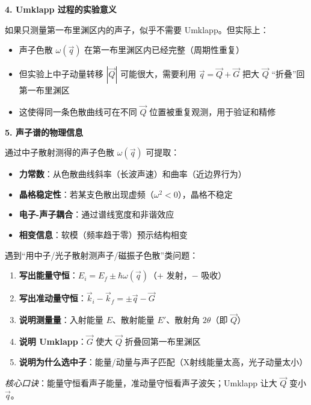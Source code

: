 \begin{insightbox}[实验方法与深层理解]
\textbf{4. Umklapp 过程的实验意义}

如果只测量第一布里渊区内的声子，似乎不需要 Umklapp。但实际上：
\begin{itemize}
    \item 声子色散 $\omega(\vec q)$ 在第一布里渊区内已经完整（周期性重复）
    \item 但实验上中子动量转移 $|\vec Q|$ 可能很大，需要利用 $\vec q=\vec Q+\vec G$ 把大 $\vec Q$ ``折叠''回第一布里渊区
    \item 这使得同一条色散曲线可在不同 $\vec Q$ 位置被重复观测，用于验证和精修
\end{itemize}

\textbf{5. 声子谱的物理信息}

通过中子散射测得的声子色散 $\omega(\vec q)$ 可提取：
\begin{itemize}
    \item \textbf{力常数}：从色散曲线斜率（长波声速）和曲率（近边界行为）
    \item \textbf{晶格稳定性}：若某支色散出现虚频（$\omega^2<0$），晶格不稳定
    \item \textbf{电子-声子耦合}：通过谱线宽度和非谐效应
    \item \textbf{相变信息}：软模（频率趋于零）预示结构相变
\end{itemize}
\end{insightbox}

\begin{thinkbox}
遇到``用中子/光子散射测声子/磁振子色散''类问题：
\begin{enumerate}
    \item \textbf{写出能量守恒}：$E_i = E_f \pm \hbar\omega(\vec q)$（$+$ 发射，$-$ 吸收）
    \item \textbf{写出准动量守恒}：$\vec k_i - \vec k_f = \pm\vec q - \vec G$
    \item \textbf{说明测量量}：入射能量 $E$、散射能量 $E'$、散射角 $2\theta$（即 $\vec Q$）
    \item \textbf{说明 Umklapp}：$\vec G$ 使大 $\vec Q$ 折叠回第一布里渊区
    \item \textbf{说明为什么选中子}：能量/动量与声子匹配（X射线能量太高，光子动量太小）
\end{enumerate}
\textit{核心口诀}：能量守恒看声子能量，准动量守恒看声子波矢；Umklapp 让大 $\vec Q$ 变小 $\vec q$。
\end{thinkbox}
